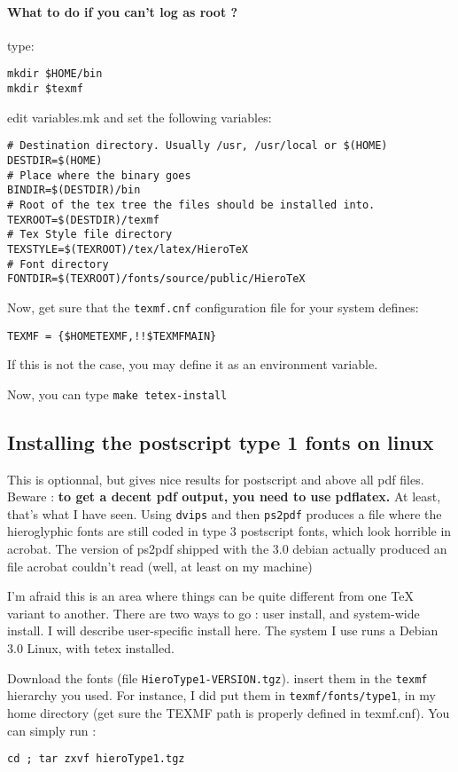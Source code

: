 \documentclass[final]{article}
\begin{document}
\paragraph{What to do if you can't log as root ?}
type:
\begin{verbatim}
mkdir $HOME/bin
mkdir $texmf
\end{verbatim}

edit variables.mk and set the following variables:
\begin{verbatim}
# Destination directory. Usually /usr, /usr/local or $(HOME)
DESTDIR=$(HOME)
# Place where the binary goes
BINDIR=$(DESTDIR)/bin
# Root of the tex tree the files should be installed into.
TEXROOT=$(DESTDIR)/texmf
# Tex Style file directory
TEXSTYLE=$(TEXROOT)/tex/latex/HieroTeX
# Font directory
FONTDIR=$(TEXROOT)/fonts/source/public/HieroTeX
\end{verbatim}

Now, get sure that the \texttt{texmf.cnf} configuration file for your system defines:
\begin{verbatim}
TEXMF = {$HOMETEXMF,!!$TEXMFMAIN}
\end{verbatim}
If this is not the case, you may define it as an environment variable.

Now, you can type \texttt{make tetex-install}

\subsection{Installing the postscript type 1 fonts on linux}

This is optionnal, but gives nice results for postscript and above all
pdf files. Beware : \textbf{to get a decent pdf output, you need to
  use pdflatex.} At least, that's what I have seen. Using
\texttt{dvips} and then \texttt{ps2pdf} produces a file where the
hieroglyphic fonts are still coded in type 3 postscript fonts, which
look horrible in acrobat. The version of ps2pdf shipped with the 3.0
debian actually produced an file acrobat couldn't read (well, at least
on my machine)

I'm afraid this is an area where things can be quite different from
one \TeX{} variant to another. There are two ways to go : user
install, and system-wide install. I will describe user-specific
install here. The system I use runs a Debian 3.0 Linux, with tetex
installed.

Download the fonts (file \texttt{HieroType1-VERSION.tgz}).  insert them in the
\texttt{texmf} hierarchy you used. For instance, I did put them in
\texttt{texmf/fonts/type1}, in my home directory (get sure the TEXMF
path is properly defined in texmf.cnf). You can simply run :
\begin{verbatim}
cd ; tar zxvf hieroType1.tgz
\end{verbatim}
\end{document}
